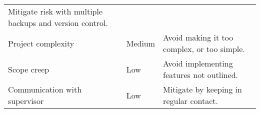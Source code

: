 \begin{longtable}[]{@{}lll@{}}
\begin{minipage}[t]{0.50\columnwidth}
Mitigate risk with multiple backups and version control.\strut
\end{minipage}\tabularnewline
\begin{minipage}[t]{0.28\columnwidth}\raggedright\strut
Project complexity\strut
\end{minipage} & \begin{minipage}[t]{0.13\columnwidth}\raggedright\strut
Medium\strut
\end{minipage} & \begin{minipage}[t]{0.50\columnwidth}\raggedright\strut
Avoid making it too complex, or too simple.\strut
\end{minipage}\tabularnewline
\begin{minipage}[t]{0.28\columnwidth}\raggedright\strut
Scope creep\strut
\end{minipage} & \begin{minipage}[t]{0.13\columnwidth}\raggedright\strut
Low\strut
\end{minipage} & \begin{minipage}[t]{0.50\columnwidth}\raggedright\strut
Avoid implementing features not outlined.\strut
\end{minipage}\tabularnewline
\begin{minipage}[t]{0.28\columnwidth}\raggedright\strut
Communication with supervisor\strut
\end{minipage} & \begin{minipage}[t]{0.13\columnwidth}\raggedright\strut
Low\strut
\end{minipage} & \begin{minipage}[t]{0.50\columnwidth}\raggedright\strut
Mitigate by keeping in regular contact.\strut
\end{minipage}\tabularnewline
\bottomrule
\end{longtable}
